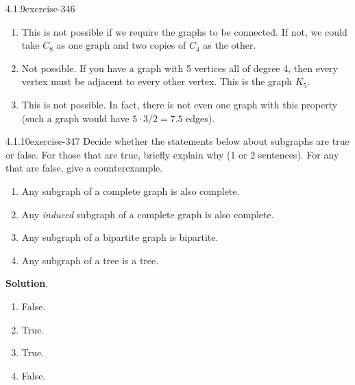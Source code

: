 \documentclass[twoside,11pt,]{book}
\numberwithin{equation}{chapter}
\newcommand{\vtx}[2]{node[fill,circle,inner sep=0pt, minimum size=4pt,label=#1:#2]{}}
\renewcommand{\v}{\vtx{above}{}}
\begin{document}
\begin{divisionsolution}{4.1.9}{}{exercise-346}
\begin{enumerate}[label=(\alph*)]
\begin{sidebyside}{2}{0.15}{0.15}{0.3}
\begin{sbspanel}{0.2}[bottom]
{{
}
}
\end{sbspanel}%
\end{sidebyside}%
\item\hypertarget{li-2232}{}\hypertarget{p-4453}{}%
This is not possible if we require the graphs to be connected. If not, we could take \(C_8\) as one graph and two copies of \(C_4\) as the other.%
\item\hypertarget{li-2233}{}\hypertarget{p-4454}{}%
Not possible. If you have a graph with 5 vertices all of degree 4, then every vertex must be adjacent to every other vertex. This is the graph \(K_5\).%
\item\hypertarget{li-2234}{}\hypertarget{p-4455}{}%
This is not possible. In fact, there is not even one graph with this property (such a graph would have \(5\cdot 3/2 = 7.5\) edges).%
\end{enumerate}
%
\end{divisionsolution}%
\begin{divisionsolution}{4.1.10}{}{exercise-347}%
\hypertarget{p-4456}{}%
Decide whether the statements below about subgraphs are true or false.  For those that are true, briefly explain why (1 or 2 sentences).  For any that are false, give a counterexample.\leavevmode%
\begin{enumerate}[label=(\alph*)]
\item\hypertarget{li-2235}{}\hypertarget{p-4457}{}%
Any subgraph of a complete graph is also complete.%
\item\hypertarget{li-2236}{}\hypertarget{p-4458}{}%
Any \emph{induced} subgraph of a complete graph is also complete.%
\item\hypertarget{li-2237}{}\hypertarget{p-4459}{}%
Any subgraph of a bipartite graph is bipartite.%
\item\hypertarget{li-2238}{}\hypertarget{p-4460}{}%
Any subgraph of a tree is a tree.%
\end{enumerate}
%
\par\smallskip%
\noindent\textbf{Solution}.\quad%
\hypertarget{p-4461}{}%
\leavevmode%
\begin{multicols}{4}
\begin{enumerate}[label=(\alph*)]
\item\hypertarget{li-2239}{}\hypertarget{p-4462}{}%
False.%
\item\hypertarget{li-2240}{}\hypertarget{p-4463}{}%
True.%
\item\hypertarget{li-2241}{}\hypertarget{p-4464}{}%
True.%
\item\hypertarget{li-2242}{}\hypertarget{p-4465}{}%
False.%
\end{enumerate}
\end{multicols}
%
\end{divisionsolution}%
\end{document}
